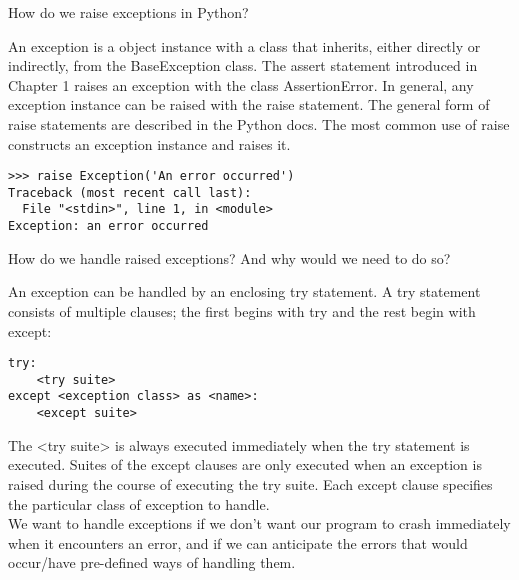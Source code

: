 \question
How do we raise exceptions in Python?

\begin{solution}[2in]
An exception is a object instance with a class that inherits, either directly or indirectly, from the BaseException class. The assert statement introduced in Chapter 1 raises an exception with the class AssertionError. In general, any exception instance can be raised with the raise statement. The general form of raise statements are described in the Python docs. The most common use of raise constructs an exception instance and raises it. \\
\begin{verbatim}
>>> raise Exception('An error occurred') 
Traceback (most recent call last): 
  File "<stdin>", line 1, in <module> 
Exception: an error occurred
\end{verbatim}

\end{solution}

\question
How do we handle raised exceptions? And why would we need to do so?

\begin{solution}[2in]
An exception can be handled by an enclosing try statement. A try statement consists of multiple clauses; the first begins with try and the rest begin with except: \\
\begin{verbatim}
try:
    <try suite>
except <exception class> as <name>: 
    <except suite>   
\end{verbatim}
The <try suite> is always executed immediately when the try statement is executed. Suites of the except clauses are only executed when an exception is raised during the course of executing the try suite. Each except clause specifies the particular class of exception to handle. \\
We want to handle exceptions if we don't want our program to crash immediately when it encounters an error, and if we can anticipate the errors that would occur/have pre-defined ways of handling them.
\end{solution}
